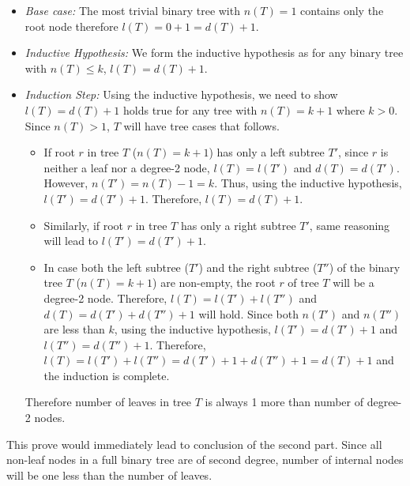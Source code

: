\begin{itemize}\itemsep=0pt
\item[] \textit{Base case:} The most trivial binary tree with $n(T)=1$ contains only the root node therefore $l(T) = 0 + 1 = d(T) + 1$.
\item[] \textit{Inductive Hypothesis:} We form the inductive hypothesis as for any binary tree with $n(T) \leq k$, $l(T) = d(T) + 1$.
\item[] \textit{Induction Step:} Using the inductive hypothesis, we need to show $l(T) = d(T)+1$ holds true for any tree with $n(T) = k+1$ where $k > 0$.
Since $n(T) > 1$, $T$ will have tree cases that follows.
  \begin{itemize}\itemsep=0pt
    \item[] If root $r$ in tree $T$ ($n(T) = k+1$) has only a left subtree $T'$, since $r$ is neither a leaf nor a degree-2 node, $l(T) = l(T')$ and $d(T)=d(T')$.
However, $n(T') = n(T) - 1 = k$.
Thus, using the inductive hypothesis, $l(T') = d(T') + 1$.
Therefore, $l(T) = d(T) + 1$.
    \item[] Similarly, if root $r$ in tree $T$ has only a right subtree $T'$, same reasoning will lead to $l(T') = d(T') + 1$.
    \item[] In case both the left subtree ($T'$) and the right subtree ($T''$) of the binary tree $T$ ($n(T) = k+1$) are non-empty, the root $r$ of tree $T$ will be a degree-2 node.
Therefore, $l(T) = l(T') + l(T'')$ and $d(T) = d(T') + d(T'') + 1$ will hold.
    Since both $n(T')$ and $n(T'')$ are less than $k$, using the inductive hypothesis, $l(T') = d(T') + 1$ and $l(T'') = d(T'') + 1$.
    Therefore, $l(T) = l(T') + l(T'') = d(T') + 1 + d(T'') + 1 = d(T) + 1$ and the induction is complete.
  \end{itemize}
  Therefore number of leaves in tree $T$ is always 1 more than number of degree-2 nodes.
\end{itemize}
This prove would immediately lead to conclusion of the second part.
Since all non-leaf nodes in a full binary tree are of second degree, number of internal nodes will be one less than the number of leaves.
